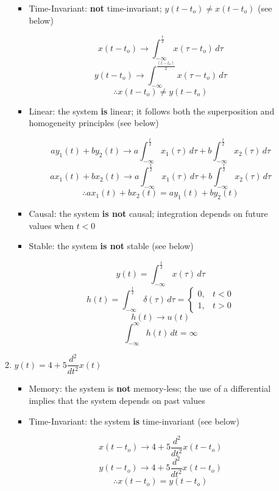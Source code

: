 \begin{enumerate}
\begin{enumerate}
\begin{itemize}
          \item Time-Invariant: \textbf{not} time-invariant; $y(t-t_o)\neq x(t-t_o)$ (see below)

            $$x(t-t_o)\to \int_{-\infty}^{\frac{t}{2}} x(\tau-t_o)\,d\tau$$
            $$y(t-t_o)\to \int_{-\infty}^{\frac{(t-t_o)}{2}} x(\tau-t_o)\,d\tau$$
            $$\therefore x(t-t_o)\neq y(t-t_o)$$

          \item Linear: the system \textbf{is} linear; it follows both the superposition and homogeneity principles (see below)

            $$ay_1(t)+by_2(t)\to a\int_{-\infty}^{\frac{t}{2}} x_1(\tau)\,d\tau+b\int_{-\infty}^{\frac{t}{2}} x_2(\tau)\,d\tau$$
            $$ax_1(t)+bx_2(t)\to a\int_{-\infty}^{\frac{t}{2}} x_1(\tau)\,d\tau+b\int_{-\infty}^{\frac{t}{2}} x_2(\tau)\,d\tau$$
            $$\therefore ax_1(t)+bx_2(t)=ay_1(t)+by_2(t)$$

          \item Causal: the system \textbf{is not} causal; integration depends on future values when $t<0$

          \item Stable: the system \textbf{is not} stable (see below)

            $$y(t)=\int_{-\infty}^{\frac{t}{2}} x(\tau)\,d\tau$$
            $$h(t)=\int_{-\infty}^{\frac{t}{2}} \delta(\tau)\,d\tau=\left\{\begin{array}{ll}0,& t<0\\1,& t>0\end{array}$$
            $$h(t)\to u(t)$$
            $$\int_{-\infty}^{\infty} h(t)\,dt=\infty$$

        \end{itemize}

      \item $y(t)=4+5\dfrac{d^2}{dt^2}x(t)$

        \begin{itemize}

          \item Memory: the system is \textbf{not} memory-less; the use of a differential implies that the system depends on past values

          \item Time-Invariant: the system \textbf{is} time-invariant (see below)

            $$x(t-t_o)\to 4+5\dfrac{d^2}{dt^2}x(t-t_o)$$
            $$y(t-t_o)\to 4+5\dfrac{d^2}{dt^2}x(t-t_o)$$
            $$\therefore x(t-t_o)=y(t-t_o)$$


\end{itemize}
\end{enumerate}
\end{enumerate}
